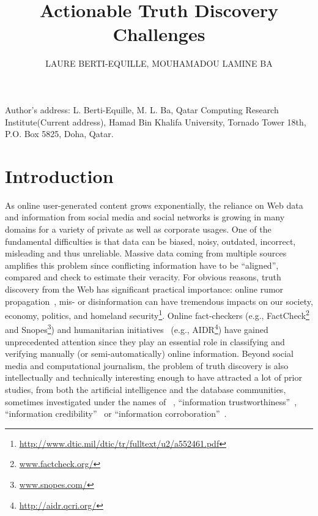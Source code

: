 \documentclass[prodmode,acmtecs]{acmsmall} %
\begin{document}
\title{Actionable Truth Discovery Challenges}
\author{LAURE BERTI-EQUILLE, MOUHAMADOU LAMINE BA
}



\begin{bottomstuff}
Author's address: L. Berti-Equille, M. L. Ba, Qatar Computing Research Institute(Current address), Hamad
Bin Khalifa University, Tornado Tower 18th, P.O. Box 5825, Doha, Qatar.
\end{bottomstuff}

\maketitle


\section{Introduction}
As online user-generated content grows exponentially, the reliance on Web data and information from social 
media and social networks is growing in many domains for a variety of private as well as corporate usages. 
One of the fundamental difficulties is that data can be biased, noisy, outdated, incorrect, misleading and
thus unreliable. Massive data coming from multiple sources amplifies this problem since conflicting information
have to be ``aligned'', compared  and check to estimate their veracity. For obvious reasons, truth discovery from 
the Web has significant practical importance: online rumor propagation~\cite{rumor-icdm2013}, mis- or disinformation
can have tremendous impacts on our society, economy, politics, and homeland security\footnote{\url{http://www.dtic.mil/dtic/tr/fulltext/u2/a552461.pdf}}. 
Online fact-checkers (e.g., FactCheck\footnote{\url{www.factcheck.org/}} and Snopes\footnote{\url{www.snopes.com/}}) and humanitarian initiatives~\cite{ImranECDM13}
(e.g., AIDR\footnote{\scriptsize{\url{http://aidr.qcri.org/}}}) have gained unprecedented attention since they play an essential role in classifying and verifying  manually (or semi-automatically) online information.
Beyond social media and computational journalism, the problem of truth discovery is also intellectually and technically interesting enough to have attracted a lot of prior studies, from both the artificial 
intelligence and the database communities, sometimes investigated under the names of  ~\cite{GoasdoueKKLMZ13}, ``information trustworthiness''~\cite{Thirunarayan2014182}, ``information credibility''~\cite{PasternackR13} or ``information corroboration''~\cite{GallandAMS10}. 
\end{document}
